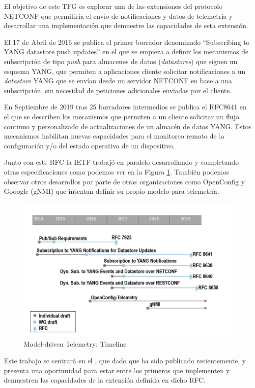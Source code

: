     El objetivo de este \gls{TFG} es explorar una de las extensiones del protocolo NETCONF que permitiría el envío de notificaciones y datos de telemetría y desarrollar una implementación que demuestre las capacidades de esta extensión.
    
    El 17 de Abril de 2016 se publica el primer borrador denominado  \enquote{Subscribing to YANG datastore push updates} en el que se empieza a definir los mecanismos de subscripción de tipo \textit{push} para almacenes de datos (\textit{datastores}) que siguen un esquema YANG, que permiten a aplicaciones cliente solicitar notificaciones a un \textit{datastore} YANG que se envían desde un servidor NETCONF en base a una subscripción, sin necesidad de peticiones adicionales enviadas por el cliente\cite{draft-ietf-netconf-yang-push-00}.

    En Septiembre de 2019 tras 25 borradores intermedios se publica el \gls{RFC}8641 en el que se describen los mecanismos que permiten a un cliente solicitar un flujo continuo y personalizado de actualizaciones de un almacén de datos YANG. Estos mecanismos habilitan nuevas capacidades para el monitoreo remoto de la configuración y/o del estado operativo de un dispositivo\cite{RFC8641}.
    
    Junto con este \gls{RFC} la \gls{IETF} trabajó en paralelo desarrollando y completando otras especificaciones como podemos ver en la Figura \ref{fig:telemetry_history}. También podemos observar otros desarrollos por parte de otras organizaciones como OpenConfig y Gooogle (gNMI) que intentan definir su propio modelo para telemetría.
    
    \begin{figure}[H]
        \centering
        \includegraphics[scale=.5]{graphics/telemetry-history-2-1024x657.jpg}
        \caption{Model-driven Telemetry: Timeline}
        \label{fig:telemetry_history}
    \end{figure}
    
    Este trabajo se centrará en el \cite{RFC8641}, que dado que ha sido publicado recientemente, y presenta una oportunidad para estar entre los primeros que implementen y demuestren las capacidades de la extensión definida en dicho \gls{RFC}.